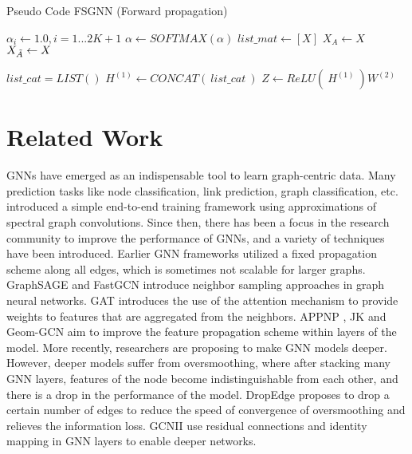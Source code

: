 \documentclass[sigconf,natbib=false]{acmart}
\begin{document}
\setlength{\textfloatsep}{1mm}
\begin{algorithm}[h!]
\DontPrintSemicolon
\caption{Pseudo Code FSGNN (Forward propagation)}
\label{alg:fsgnn}
    \BlankLine
    $\alpha_i\leftarrow1.0,  i=1...2K+1$ \;
    $\alpha \leftarrow SOFTMAX(\alpha)$ \;
    $list\_mat \leftarrow [X]$ \;
    $X_A\leftarrow X$ \;
    $X_{\Tilde{A}} \leftarrow X$ \;

    $list\_cat = LIST()    $\;
    $H^{(1)} \leftarrow CONCAT(\:list\_cat\:)$ \;
    $Z \leftarrow ReLU(\: H^{(1)}\:)W^{(2)}$


\end{algorithm}




\section{Related Work}
\label{related_work}

GNNs have emerged as an indispensable tool to learn graph-centric data. Many prediction tasks like node classification, link prediction, graph classification, etc. \cite{defferrard_convolutional_2016}\cite{kipf_semi-supervised_2017} introduced a simple end-to-end training framework using approximations of spectral graph convolutions. Since then, there has been a focus in the research community to improve the performance of GNNs, and a variety of techniques have been introduced. Earlier GNN frameworks utilized a fixed propagation scheme along all edges, which is sometimes not scalable for larger graphs. GraphSAGE\cite{hamilton_inductive_2017} and FastGCN\cite{chen_fastgcn:_2018} introduce neighbor sampling approaches in graph neural networks. GAT \cite{velickovic_graph_2017} introduces the use of the attention mechanism to provide weights to features that are aggregated from the neighbors. APPNP \cite{klicpera_predict_2018}, JK \cite{xu_representation_2018} and Geom-GCN \cite{pei_geom-gcn_2020} aim to improve the feature propagation scheme within layers of the model. More recently, researchers are proposing to make GNN models deeper. However, deeper models suffer from oversmoothing, where after stacking many GNN layers, features of the node become indistinguishable from each other, and there is a drop in the performance of the model. DropEdge \cite{rong_dropedge_2020} proposes to drop a certain number of edges to reduce the speed of convergence of oversmoothing and relieves the information loss. GCNII \cite{chen_simple_2020} use residual connections and identity mapping in GNN layers to enable deeper networks. 
\end{document}
